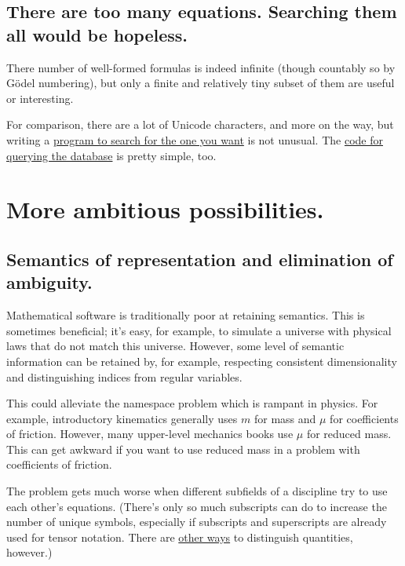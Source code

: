 \documentclass[12pt,letterpaper]{article}
\begin{document}
\subsection{There are too many equations. Searching them all would be hopeless.}

There number of well-formed formulas is indeed infinite
(though countably so by Gödel numbering),
but only a finite and relatively tiny subset of them are useful or interesting.

For comparison,
there are a lot of Unicode characters,
and more on the way,
but writing a
\href{https://mail.python.org/pipermail/python-announce-list/2003-April/002183.html}
{program to search for the one you want} is not unusual.
The
\href{http://sources.debian.net/src/unicode/0.9.7/unicode}
{code for querying the database} is pretty simple, too.

\section{More ambitious possibilities.}\label{sec:ambitious}

\subsection{Semantics of representation and elimination of ambiguity.}

Mathematical software is traditionally poor at retaining semantics.
This is sometimes beneficial;
it's easy, for example,
to simulate a universe with physical laws that do not match this universe.
However, some level of semantic information can be retained by,
for example, respecting consistent dimensionality and distinguishing indices from regular variables.

This could alleviate the namespace problem which is rampant in physics.
For example,
introductory kinematics generally uses $m$ for mass and $\mu$ for coefficients of friction.
However, many upper-level mechanics books use $\mu$ for reduced mass.
This can get awkward if you want to use reduced mass in a problem with coefficients of friction.

The problem gets much worse when different subfields of a discipline try to use each other's equations.
(There's only so much subscripts can do to increase the number of unique symbols,
especially if subscripts and superscripts are already used for tensor notation.
There are \hyperref[color-coding]{other ways} to distinguish quantities, however.)
\end{document}

